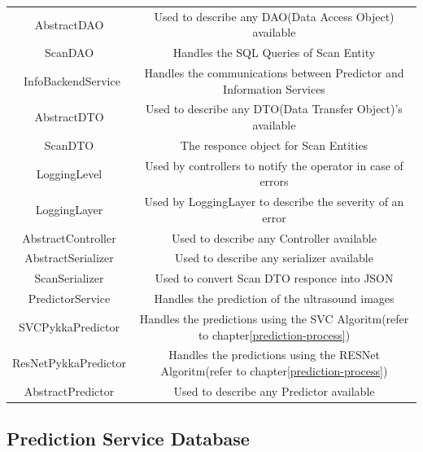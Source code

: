 			\begin{center}
				\begin{tabular}{ |c|c| } 
					\hline
					AbstractDAO & Used to describe any DAO(Data Access Object) available \\
					ScanDAO & Handles the SQL Queries of Scan Entity  \\\
					InfoBackendService & Handles the communications between Predictor and Information Services\\
					AbstractDTO & Used to describe any DTO(Data Transfer Object)'s available\\
					ScanDTO & The responce object for Scan Entities\\
					LoggingLevel &Used by controllers to notify the operator in case of errors\\
					LoggingLayer & Used by LoggingLayer to describe the severity of an error\\
					AbstractController & Used to describe any Controller available\\
					AbstractSerializer &  Used to describe any serializer available\\
					ScanSerializer & Used to convert Scan DTO responce into JSON\\
					PredictorService & Handles the prediction of the ultrasound images\\
					SVCPykkaPredictor & Handles the predictions using the SVC Algoritm(refer to chapter\ref{prediction-process})\\
					ResNetPykkaPredictor & Handles the predictions using the RESNet Algoritm(refer to chapter\ref{prediction-process})\\
					AbstractPredictor & Used to describe any Predictor available\\
					\hline
				\end{tabular}
			\end{center}
		\subsection{Prediction Service Database}
		
